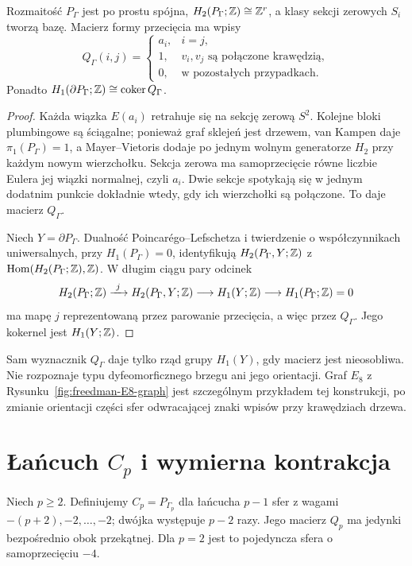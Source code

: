 \begin{stwierdzenie}
\label{prop:plumbing-macierz-cztery}
Rozmaitość $P_\Gamma$ jest po prostu spójna,
$H_2(P_\Gamma;\mathbb{Z})\cong\mathbb{Z}^r$, a klasy sekcji zerowych
$S_i$ tworzą bazę. Macierz formy przecięcia ma wpisy
\[
 Q_\Gamma(i,j)=
 \begin{cases}
 a_i,&i=j,\\
 1,&v_i,v_j\text{ są połączone krawędzią},\\
 0,&\text{w pozostałych przypadkach}.
 \end{cases}
\]
Ponadto $H_1(\partial P_\Gamma;\mathbb{Z})
\cong\operatorname{coker}Q_\Gamma$.
\end{stwierdzenie}
\begin{proof}
Każda wiązka $E(a_i)$ retrahuje się na sekcję zerową
$S^2$. Kolejne bloki plumbingowe są ściągalne;
ponieważ graf sklejeń jest drzewem, van Kampen daje
$\pi_1(P_\Gamma)=1$, a Mayer--Vietoris dodaje po
jednym wolnym generatorze $H_2$ przy każdym nowym
wierzchołku. Sekcja zerowa ma samoprzecięcie równe
liczbie Eulera jej wiązki normalnej, czyli $a_i$.
Dwie sekcje spotykają się w jednym dodatnim punkcie
dokładnie wtedy, gdy ich wierzchołki są połączone.
To daje macierz $Q_\Gamma$.

Niech $Y=\partial P_\Gamma$. Dualność
Poincarégo--Lefschetza i twierdzenie o współczynnikach
uniwersalnych, przy $H_1(P_\Gamma)=0$, identyfikują
$H_2(P_\Gamma,Y;\mathbb{Z})$ z
$\operatorname{Hom}(H_2(P_\Gamma;\mathbb{Z}),\mathbb{Z})$.
W długim ciągu pary odcinek
\[
 H_2(P_\Gamma;\mathbb{Z})\xrightarrow{\ j\ }
 H_2(P_\Gamma,Y;\mathbb{Z})\longrightarrow H_1(Y;\mathbb{Z})
 \longrightarrow H_1(P_\Gamma;\mathbb{Z})=0
\]
ma mapę $j$ reprezentowaną przez parowanie przecięcia,
a więc przez $Q_\Gamma$. Jego kokernel jest $H_1(Y;\mathbb{Z})$.
\end{proof}

Sam wyznacznik $Q_\Gamma$ daje tylko rząd grupy
$H_1(Y)$, gdy macierz jest nieosobliwa. Nie rozpoznaje
typu dyfeomorficznego brzegu ani jego orientacji.
Graf $E_8$ z Rysunku~\ref{fig:freedman-E8-graph}
jest szczególnym przykładem tej konstrukcji,
po zmianie orientacji części sfer odwracającej
znaki wpisów przy krawędziach drzewa.

\section{Łańcuch \texorpdfstring{$C_p$}{Cp} i wymierna kontrakcja}
\label{sec:kontrakcja-wymierna-cztery}

Niech $p\geq2$. Definiujemy $C_p=P_{\Gamma_p}$ dla
łańcucha $p-1$ sfer z wagami
$-(p+2),-2,\ldots,-2$; dwójka występuje $p-2$ razy.
Jego macierz $Q_p$ ma jedynki bezpośrednio obok
przekątnej. Dla $p=2$ jest to pojedyncza sfera
o samoprzecięciu $-4$.

